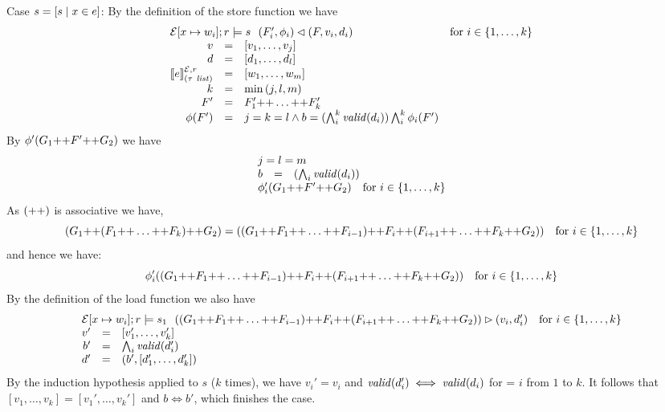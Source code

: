 {\begin{description}
\item{Case $s = [ s \mid x \in e ]$:}
By the definition of the store function we have
\[
\begin{array}{rcll}
\multicolumn{3}{l}{\store{\Env[x \mapsto w_i]}{F}{r}{v_i,d_i}{s}{F_i',\phi_i}} & \text{for}~i \in \{1,\dots,k\}\\
v &=& [v_1,\dots,v_j]\\
d &=& [d_1,\dots,d_l]\\
\eval{e}{\Env,r}{(\tau\ \mathit{list})} &=& [w_1,\dots,w_m ]\\
k &=& \min{(j,l,m)}\\
F' &=& F_1' \FAppend \dots \FAppend F_k'\\
\phi(F') &=& j = k = l \wedge b = (\bigwedge_i^k \valid{d_i}) \bigwedge_i^k \phi_i(F')\\
\end{array}
\]
By $\phi'(G_1 \text{++} F' \text{++} G_2)$ we have
\[
\begin{array}{rcll}
\multicolumn{3}{l}{j = l = m}\\
b &=& (\bigwedge_i \valid{d_i})\\
\multicolumn{3}{l}{\phi_i'(G_1 \FAppend F' \FAppend G_2) \quad \text{for}~i \in \{1,\dots,k\}}\\
\end{array}
\]
%
As $(\text{++})$ is associative we have,
\[
(G_1\text{++} (F_1\text{++} \dots \text{++} F_k)\text{++} G_2) =
((G_1\text{++} F_1\text{++} \dots \text{++} F_{i-1}) \text{++} F_i \text{++} (F_{i+1} \text{++} \dots \text{++} F_k \text{++} G_2)) 
\quad \text{for}~i \in \{1,\dots,k\}
\]
and hence we have:
\[
\phi_i'((G_1\text{++} F_1\text{++} \dots \text{++} F_{i-1}) \text{++} F_i \text{++} (F_{i+1} \text{++} \dots \text{++} F_k \text{++} G_2)) 
\quad \text{for}~i \in \{1,\dots,k\}
\]
%
By the definition of the load function we also have 
\[ 
\begin{array}{rcll}
\multicolumn{3}{l}{\load{\Env[ x \mapsto w_i]}{((G_1\FAppend F_1\FAppend \dots \FAppend F_{i-1}) \FAppend F_i \FAppend (F_{i+1} \FAppend \dots \FAppend F_k \FAppend G_2))}{r}{s_1}{v_i,d_i'}} & \text{for}~i \in \{1,\dots,k\}\\
v' &=& [v_1',\dots,v_k']\\
b' &= &\bigwedge_i \valid{d_i'}\\
d' &=& (b',[d_1',\dots,d_k'])\\
\end{array}
\]
%
By the induction hypothesis applied to $s$ ($k$ times), we have $v_i'
= v_i$ and $\mathit{valid}(d_i') \iff \mathit{valid}(d_i)$ for = $i$ from $1$ to
$k$. It follows that $[v_1,\dots,v_k] = [v_1',\dots,v_k']$ and $b \iff
b'$, which finishes the case.


\end{description}}
